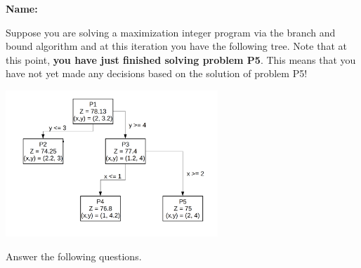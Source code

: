 \documentclass[letterpaper,oneside,12pt]{article}%
\begin{document}
\noindent{}

\vspace{3mm} \hspace{\fill} \textbf{Name: \underline{\hspace{6cm}}}

Suppose you are solving a maximization integer program via the branch and bound algorithm and at this iteration you have the following tree. Note that at this point, \textbf{you have just finished solving problem P5}. This means that you have not yet made any decisions based on the solution of problem P5!

\begin{center}
\includegraphics[width=0.60\textwidth]{B&B_example.png}
\end{center}

Answer the following questions.
\end{document}
